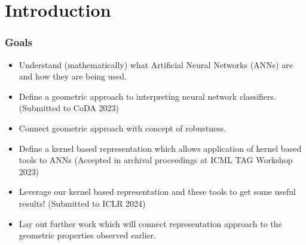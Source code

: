 \section{Introduction} %
\label{Chapter1} %




\begin{frame}
  \frametitle{Goals}
  \begin{itemize}
      \item<1-> Understand (mathematically) what Artificial Neural
        Networks (ANNs) are and how they are being used. 
      \item<2-> Define a geometric approach to interpreting neural
        network classifiers. (Submitted to CoDA 2023)
      \item<3-> Connect geometric approach with concept of 
        robustness. 
      \item<4-> Define a kernel based representation which allows application
        of kernel based tools to ANNs (Accepted in archival
        proceedings at ICML TAG Workshop 2023)
      \item<5-> Leverage our kernel based representation and these
        tools to get some useful results! (Submitted to ICLR 2024)
      \item<6-> Lay out further work which will connect representation
        approach to the geometric properties observed earlier. 
  \end{itemize}
\end{frame}


